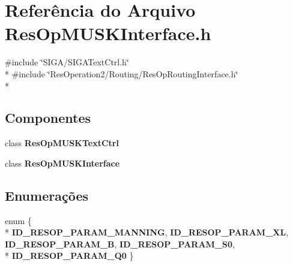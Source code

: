 \section{Referência do Arquivo Res\+Op\+M\+U\+S\+K\+Interface.\+h}
\label{_res_op_m_u_s_k_interface_8h}
{\ttfamily \#include \char`\"{}S\+I\+G\+A/\+S\+I\+G\+A\+Text\+Ctrl.\+h\char`\"{}}\\*
{\ttfamily \#include \char`\"{}Res\+Operation2/\+Routing/\+Res\+Op\+Routing\+Interface.\+h\char`\"{}}\\*
\subsection*{Componentes}
\begin{DoxyCompactItemize}
\item 
class {\bf Res\+Op\+M\+U\+S\+K\+Text\+Ctrl}
\item 
class {\bf Res\+Op\+M\+U\+S\+K\+Interface}
\end{DoxyCompactItemize}
\subsection*{Enumerações}
\begin{DoxyCompactItemize}
\item 
enum \{ \\*
{\bf I\+D\+\_\+\+R\+E\+S\+O\+P\+\_\+\+P\+A\+R\+A\+M\+\_\+\+M\+A\+N\+N\+I\+NG}, 
{\bf I\+D\+\_\+\+R\+E\+S\+O\+P\+\_\+\+P\+A\+R\+A\+M\+\_\+\+XL}, 
{\bf I\+D\+\_\+\+R\+E\+S\+O\+P\+\_\+\+P\+A\+R\+A\+M\+\_\+B}, 
{\bf I\+D\+\_\+\+R\+E\+S\+O\+P\+\_\+\+P\+A\+R\+A\+M\+\_\+\+S0}, 
\\*
{\bf I\+D\+\_\+\+R\+E\+S\+O\+P\+\_\+\+P\+A\+R\+A\+M\+\_\+\+Q0}
 \}
\end{DoxyCompactItemize}
